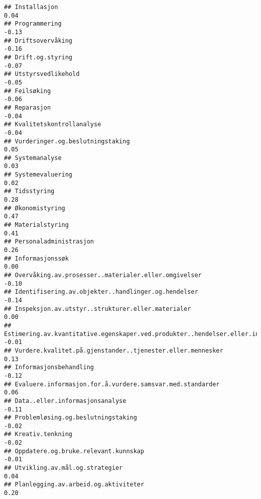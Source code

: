 \documentclass[
]{article}
\begin{document}
\begin{verbatim}
## Installasjon                                                                      0.04
## Programmering                                                                    -0.13
## Driftsovervåking                                                                 -0.16
## Drift.og.styring                                                                 -0.07
## Utstyrsvedlikehold                                                               -0.05
## Feilsøking                                                                       -0.06
## Reparasjon                                                                       -0.04
## Kvalitetskontrollanalyse                                                         -0.04
## Vurderinger.og.beslutningstaking                                                  0.05
## Systemanalyse                                                                     0.03
## Systemevaluering                                                                  0.02
## Tidsstyring                                                                       0.28
## Økonomistyring                                                                    0.47
## Materialstyring                                                                   0.41
## Personaladministrasjon                                                            0.26
## Informasjonssøk                                                                   0.00
## Overvåking.av.prosesser..materialer.eller.omgivelser                             -0.10
## Identifisering.av.objekter..handlinger.og.hendelser                              -0.14
## Inspeksjon.av.utstyr..strukturer.eller.materialer                                 0.00
## Estimering.av.kvantitative.egenskaper.ved.produkter..hendelser.eller.informasjon -0.01
## Vurdere.kvalitet.på.gjenstander..tjenester.eller.mennesker                        0.13
## Informasjonsbehandling                                                           -0.12
## Evaluere.informasjon.for.å.vurdere.samsvar.med.standarder                         0.06
## Data..eller.informasjonsanalyse                                                  -0.11
## Problemløsing.og.beslutningstaking                                               -0.02
## Kreativ.tenkning                                                                 -0.02
## Oppdatere.og.bruke.relevant.kunnskap                                             -0.01
## Utvikling.av.mål.og.strategier                                                    0.04
## Planlegging.av.arbeid.og.aktiviteter                                              0.20

\end{verbatim}
\end{document}
